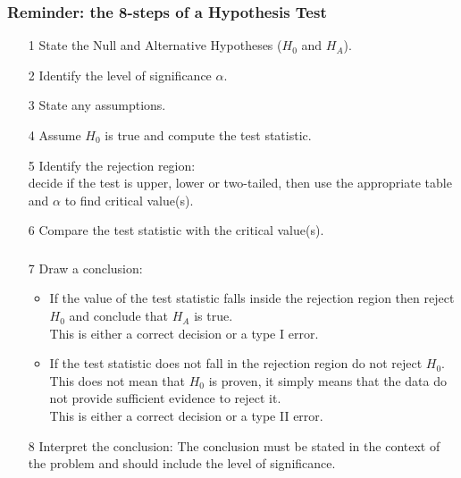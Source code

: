 \documentclass[12pt,xcolor=dvipsnames,handout,mathserif,aspectratio=169]{beamer}
\begin{document}
\begin{frame}\frametitle{Reminder: the 8-steps of a Hypothesis Test}
\begin{enumerate}
\item[1] State the Null and Alternative Hypotheses ($H_0$ and $H_A$).
\vspace*{0.5cm}
\item[2] Identify the level of significance $\alpha$.
\vspace*{0.5cm}
\item[3] State any assumptions.
\vspace*{0.5cm}
\item[4] Assume $H_0$ is true and compute the test statistic. \pause
\vspace*{0.5cm}
\item[5] Identify the rejection region: \\ decide if the test is upper, lower or two-tailed, then use the appropriate table and $\alpha$ to find critical value(s).
\vspace*{0.5cm}
\item[6] Compare the test statistic with the critical value(s). \pause
\end{enumerate}
\end{frame}

\begin{frame}\frametitle{}
\begin{enumerate}
\item[7] Draw a conclusion:\\
\begin{itemize}
\item If the value of the test statistic falls inside the rejection region then reject $H_0$ and conclude that $H_A$ is true. \\This is either a correct decision or a type I error. 
\vspace*{0.5cm}
\item If the test statistic does not fall in the rejection region do not reject $H_0$. This does not mean that $H_0$ is proven, it simply means that the data do not provide sufficient evidence to reject it. \\
 This is either a correct decision or a type II error. \pause
 \end{itemize}
 \vspace*{0.5cm}
\item[8] Interpret the conclusion: The conclusion must be stated in the context of the problem and should include the level of significance.
    \end{enumerate}
\end{frame}
\end{document}
